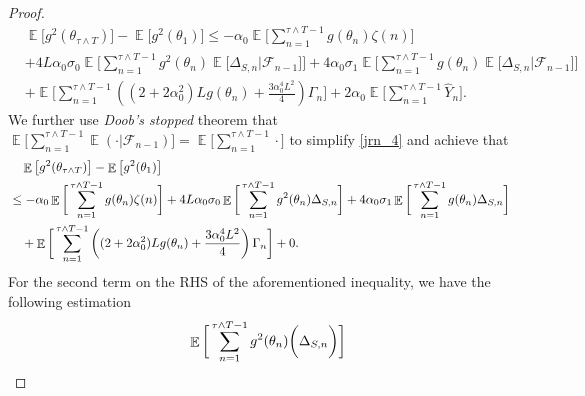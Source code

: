 \documentclass[standalone]{article}
\DeclareMathOperator{\Expect}{\mathbb{E}}
\begin{document}
\begin{proof}
\begin{equation}\label{jrn_4}\begin{aligned}
&\Expect\big[{g^{2}(\theta_{\tau\wedge T})}\big]-\Expect\big[{g^{2}(\theta_{1})}\big]\le- \alpha_0 \Expect\bigg[\sum_{n=1}^{\tau\wedge T-1}g(\theta_{n}) \zeta(n)\bigg]\\&+4 L\alpha_{0}\sigma_{0}\Expect\bigg[\sum_{n=1}^{\tau\wedge T-1}g^{2}(\theta_{n})\Expect\bigg[\Delta_{S,n}\bigg|\mathscr{F}_{n-1}\bigg]\bigg]+4\alpha_{0}\sigma_{1}\Expect\bigg[\sum_{n=1}^{\tau\wedge T-1}g(\theta_{n})\Expect\bigg[\Delta_{S,n}\bigg|\mathscr{F}_{n-1}\bigg]\bigg]\\&+\Expect\bigg[\sum_{n=1}^{\tau\wedge T-1}\left((2+2\alpha_0^2) Lg(\theta_n) + \frac{3\alpha_0^4 L^2}{4} \right) \Gamma_n\bigg]+2\alpha_0\Expect\bigg[\sum_{n=1}^{\tau\wedge T-1} \hat{Y}_n\bigg]. 
\end{aligned}\end{equation} 
We further use \emph{Doob's stopped} theorem that $\Expect\big[\sum_{n=1}^{\tau\wedge T-1}\Expect(\cdot|\mathscr{F}_{n-1})\big]=\Expect\big[\sum_{n=1}^{\tau\wedge T-1}\cdot\big]$ to simplify \cref{jrn_4} and achieve that 
\begin{align}\label{jrn_5}
& \quad \Expect\big[{g^{2}(\theta_{\tau\wedge T})}\big]-\Expect\big[{g^{2}(\theta_{1})}\big] \notag \\
&\le- \alpha_0 \Expect\bigg[\sum_{n=1}^{\tau\wedge T-1}g(\theta_{n}) \zeta(n)\bigg]+4 L\alpha_{0}\sigma_{0}\Expect\bigg[\sum_{n=1}^{\tau\wedge T-1}g^{2}(\theta_{n})\Delta_{S,n}\bigg]+4\alpha_{0}\sigma_{1}\Expect\bigg[\sum_{n=1}^{\tau\wedge T-1}g(\theta_{n})\Delta_{S,n}\bigg] \notag \\&\quad +\Expect\bigg[\sum_{n=1}^{\tau\wedge T-1}\left((2+2\alpha_0^2) Lg(\theta_n) + \frac{3\alpha_0^4 L^2}{4} \right) \Gamma_n\bigg] + 0.
\end{align}
For the second term on the RHS of the aforementioned inequality, we have the following estimation
\begin{equation}\label{jrn_6}\begin{aligned}
&\quad \Expect\bigg[\sum_{n=1}^{\tau\wedge T-1}g^{2}(\theta_{n})\bigg(\Delta_{S, n}\bigg)\bigg] \notag \\

\end{aligned}
\end{equation}
\end{proof}
\end{document}
